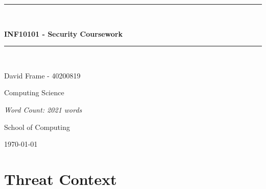 \documentclass[12pt,a4paper]{article}
\begin{document}
%

\newcommand{\HRule}{\rule{\linewidth}{0.5mm}}

\begin{titlepage}
	\begin{center}

	\HRule \\[0.4cm]
    	{\Large \bfseries INF10101 - Security Coursework\par}
	\vspace{0.2cm}
	\HRule \\[1.5cm]

	
    	\vspace{1cm}
	\begin{minipage}{0.8\textwidth}
	\begin{center} \large
        David Frame - 40200819
        	
				
   	 \end{center}
    	\end{minipage}
	
    	\begin{minipage}{1\textwidth}
    	\begin{center} \large
        
		Computing Science
    	\end{center}
    	\end{minipage}
    	
    \vspace{2cm}
    \begin{minipage}{0.8\textwidth}
	\begin{center} \large
        \emph{Word Count: 2021 words}
        	
				
   	 \end{center}
    	\end{minipage}
	
	

    	\vfill

	\begin{minipage}{1\textwidth}
    	\begin{center} \large
		School of Computing
    	\end{center}
    	\end{minipage}
	
	\vspace{1cm}
    	{\large \today}


	\end{center}
\end{titlepage}

\section{Threat Context}
\end{document}
